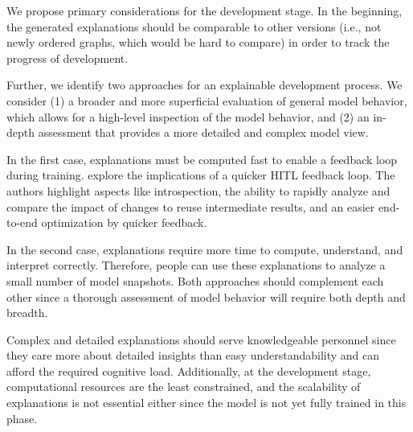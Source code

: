 \documentclass[twoside,11pt]{article}
\begin{document}
\begin{enumerate}

We propose primary considerations for the development stage. In the beginning, the generated explanations should be comparable to other versions (i.e., not newly ordered graphs, which would be hard to compare) in order to track the progress of development. 

Further, we identify two approaches for an explainable development process. We consider (1) a broader and more superficial evaluation of general model behavior, which allows for a high-level inspection of the model behavior, and (2) an in-depth assessment that provides a more detailed and complex model view.

In the first case, explanations must be computed fast to enable a feedback loop during training. \citet{XinEtAl:2018:HITLMLFeedbackLoop} explore the implications of a quicker HITL feedback loop. The authors highlight aspects like introspection, the ability to rapidly analyze and compare the impact of changes to reuse intermediate results, and an easier end-to-end optimization by quicker feedback.

In the second case, explanations require more time to compute, understand, and interpret correctly. Therefore, people can use these explanations to analyze a small number of model snapshots.
Both approaches should complement each other since a thorough assessment of model behavior will require both depth and breadth.


Complex and detailed explanations should serve knowledgeable personnel since they care more about detailed insights than easy understandability and can afford the required cognitive load. Additionally, at the development stage, computational resources are the least constrained, and the scalability of explanations is not essential either since the model is not yet fully trained in this phase.


\end{enumerate}
\end{document}
